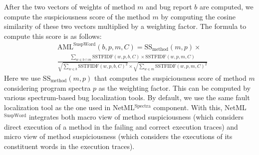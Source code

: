 After the two vectors of weights of method $m$ and bug report $b$ are computed, we compute the suspiciousness score of the method $m$ by computing the cosine similarity of these two vectors multiplied by a weighting factor. The formula to compute this score is as follows:
\begin{align}
&\text{AML}^\text{SuspWord}(b,p,m,C)=\text{SS}_{\text{method}}(m,p)\nonumber \times\\
&\frac{\sum\limits_{w\in b \cap m} \text{SSTFIDF}(w,p,b,C)\times \text{SSTFIDF}(w,p,m,C)}{\sqrt{\sum\limits_{w \in b} \text{SSTFIDF}(w,p,b,C)^2} \times \sqrt{\sum\limits_{w \in m} \text{SSTFIDF}(w,p,m,C)^2}}
\label{eq:sum_vsm_susp}
\end{align}
Here we use $\text{SS}_\text{method}(m,p)$ that computes the suspiciousness score of method $m$ considering program spectra $p$ as the weighting factor. This can be computed by various spectrum-based bug localization tools. By default, we use the same fault localization tool as the one used in NetML$^\text{Spectra}$ component. With this, NetML$^\text{SuspWord}$ integrates both macro view of method suspiciousness (which considers direct execution of a method in the failing and correct execution traces) and micro view of method suspiciousness (which considers the executions of its constituent words in the execution traces).






